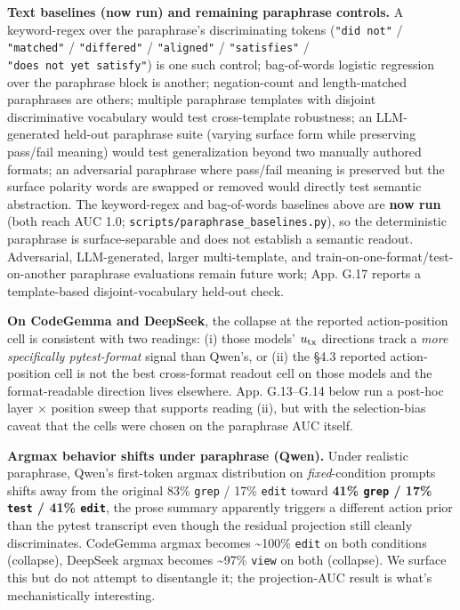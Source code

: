 \documentclass[
  11pt,
  a4paper]{article}
\begin{document}
\textbf{Text baselines (now run) and remaining paraphrase controls.} A
keyword-regex over the paraphrase's discriminating tokens
(\texttt{"did\ not"} / \texttt{"matched"} / \texttt{"differed"} /
\texttt{"aligned"} / \texttt{"satisfies"} /
\texttt{"does\ not\ yet\ satisfy"}) is one such control; bag-of-words
logistic regression over the paraphrase block is another; negation-count
and length-matched paraphrases are others; multiple paraphrase templates
with disjoint discriminative vocabulary would test cross-template
robustness; an LLM-generated held-out paraphrase suite (varying surface
form while preserving pass/fail meaning) would test generalization
beyond two manually authored formats; an adversarial paraphrase where
pass/fail meaning is preserved but the surface polarity words are
swapped or removed would directly test semantic abstraction. The
keyword-regex and bag-of-words baselines above are \textbf{now run}
(both reach AUC 1.0; \texttt{scripts/paraphrase\_baselines.py}), so the
deterministic paraphrase is surface-separable and does not establish a
semantic readout. Adversarial, LLM-generated, larger multi-template, and
train-on-one-format/test-on-another paraphrase evaluations remain future
work; App. G.17 reports a template-based disjoint-vocabulary held-out
check.

\textbf{On CodeGemma and DeepSeek}, the collapse at the reported
action-position cell is consistent with two readings: (i) those models'
\(u_{\rm tx}\) directions track a \emph{more specifically pytest-format}
signal than Qwen's, or (ii) the \S{}4.3 reported action-position cell is
not the best cross-format readout cell on those models and the
format-readable direction lives elsewhere. App. G.13--G.14 below run a
post-hoc layer \ensuremath{\times} position sweep that supports reading (ii), but with the
selection-bias caveat that the cells were chosen on the paraphrase AUC
itself.

\textbf{Argmax behavior shifts under paraphrase (Qwen).} Under realistic
paraphrase, Qwen's first-token argmax distribution on
\emph{fixed}-condition prompts shifts away from the original 83\%
\texttt{grep} / 17\% \texttt{edit} toward \textbf{41\% \texttt{grep} /
17\% \texttt{test} / 41\% \texttt{edit}}, the prose summary apparently
triggers a different action prior than the pytest transcript even though
the residual projection still cleanly discriminates. CodeGemma argmax
becomes \textasciitilde100\% \texttt{edit} on both conditions
(collapse), DeepSeek argmax becomes \textasciitilde97\% \texttt{view} on
both (collapse). We surface this but do not attempt to disentangle it;
the projection-AUC result is what's mechanistically interesting.
\end{document}
